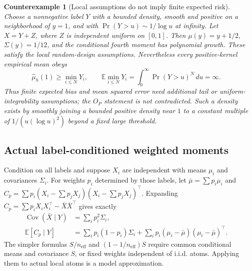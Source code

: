 \documentclass[11pt]{article}
\newtheorem{example}[theorem]{Counterexample}
\newcommand{\E}{\mathbb E}
\newcommand{\Cov}{\operatorname{Cov}}
\begin{document}
\begin{example}[Local assumptions do not imply finite expected risk]
Choose a nonnegative label $Y$ with a bounded density, smooth and positive on
a neighborhood of $y=1$, and with $\Pr(Y>u)\sim1/\log u$ at infinity.
Let $X=Y+Z$, where $Z$ is independent uniform on $[0,1]$.
Then $\mu(y)=y+1/2$, $\Sigma(y)=1/12$, and the conditional fourth moment has
polynomial growth. These satisfy the local random-design assumptions.
Nevertheless every positive-kernel empirical mean obeys
\[
\widehat\mu_h(1)\ge\min_{i\le N}Y_i,\qquad
\E\min_{i\le N}Y_i=\int_0^\infty\Pr(Y>u)^N\,du=\infty.
\]
Thus finite expected bias and mean squared error need additional tail or
uniform-integrability assumptions; the $O_P$ statement is not contradicted.
Such a density exists by smoothly joining a bounded positive density near $1$
to a constant multiple of $1/(u(\log u)^2)$ beyond a fixed large threshold.
\end{example}

\subsection{Actual label-conditioned weighted moments}
Condition on all labels and suppose $X_i$ are independent with means $\mu_i$
and covariances $\Sigma_i$. For weights $p_i$ determined by those labels, let
$\bar\mu=\sum p_i\mu_i$ and $C_p=\sum p_i(X_i-\sum p_jX_j)(X_i-\sum p_jX_j)^\top$.
Expanding $C_p=\sum p_iX_iX_i^\top-\bar X\bar X^\top$ gives exactly
\begin{align*}
\Cov(\bar X\mid Y)&=\sum_i p_i^2\Sigma_i,\\
\E[C_p\mid Y]&=\sum_i p_i(1-p_i)\Sigma_i
+\sum_i p_i(\mu_i-\bar\mu)(\mu_i-\bar\mu)^\top.
\end{align*}
The simpler formulas $S/n_{\mathrm{eff}}$ and $(1-1/n_{\mathrm{eff}})S$ require
common conditional means and covariance $S$, or fixed weights independent of
i.i.d. atoms. Applying them to actual local atoms is a model approximation.
\end{document}
